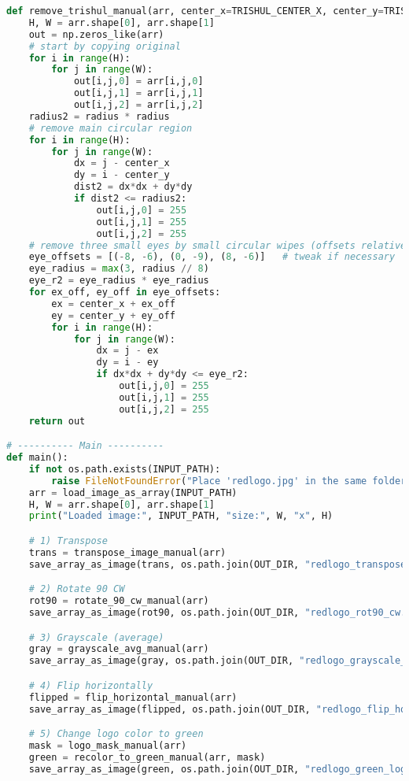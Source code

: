 \documentclass[11pt,a4paper]{article}
\begin{document}
\begin{lstlisting}[language=Python, caption=Manual 2x2 tile snippet]
def remove_trishul_manual(arr, center_x=TRISHUL_CENTER_X, center_y=TRISHUL_CENTER_Y, radius=TRISHUL_RADIUS):
    H, W = arr.shape[0], arr.shape[1]
    out = np.zeros_like(arr)
    # start by copying original
    for i in range(H):
        for j in range(W):
            out[i,j,0] = arr[i,j,0]
            out[i,j,1] = arr[i,j,1]
            out[i,j,2] = arr[i,j,2]
    radius2 = radius * radius
    # remove main circular region
    for i in range(H):
        for j in range(W):
            dx = j - center_x
            dy = i - center_y
            dist2 = dx*dx + dy*dy
            if dist2 <= radius2:
                out[i,j,0] = 255
                out[i,j,1] = 255
                out[i,j,2] = 255
    # remove three small eyes by small circular wipes (offsets relative to center)
    eye_offsets = [(-8, -6), (0, -9), (8, -6)]   # tweak if necessary
    eye_radius = max(3, radius // 8)
    eye_r2 = eye_radius * eye_radius
    for ex_off, ey_off in eye_offsets:
        ex = center_x + ex_off
        ey = center_y + ey_off
        for i in range(H):
            for j in range(W):
                dx = j - ex
                dy = i - ey
                if dx*dx + dy*dy <= eye_r2:
                    out[i,j,0] = 255
                    out[i,j,1] = 255
                    out[i,j,2] = 255
    return out

# ---------- Main ----------
def main():
    if not os.path.exists(INPUT_PATH):
        raise FileNotFoundError("Place 'redlogo.jpg' in the same folder as this script or update INPUT_PATH.")
    arr = load_image_as_array(INPUT_PATH)
    H, W = arr.shape[0], arr.shape[1]
    print("Loaded image:", INPUT_PATH, "size:", W, "x", H)

    # 1) Transpose
    trans = transpose_image_manual(arr)
    save_array_as_image(trans, os.path.join(OUT_DIR, "redlogo_transpose.png"))

    # 2) Rotate 90 CW
    rot90 = rotate_90_cw_manual(arr)
    save_array_as_image(rot90, os.path.join(OUT_DIR, "redlogo_rot90_cw.png"))

    # 3) Grayscale (average)
    gray = grayscale_avg_manual(arr)
    save_array_as_image(gray, os.path.join(OUT_DIR, "redlogo_grayscale_avg.png"), mode="L")

    # 4) Flip horizontally
    flipped = flip_horizontal_manual(arr)
    save_array_as_image(flipped, os.path.join(OUT_DIR, "redlogo_flip_horizontal.png"))

    # 5) Change logo color to green
    mask = logo_mask_manual(arr)
    green = recolor_to_green_manual(arr, mask)
    save_array_as_image(green, os.path.join(OUT_DIR, "redlogo_green_logo.png"))


\end{lstlisting}
\end{document}
